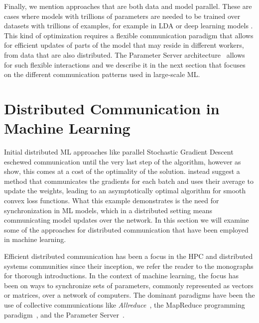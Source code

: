 Finally, we mention approaches that are both data and model parallel. These are
cases where models with trillions of parameters are needed to be trained over datasets with trillions of examples, for
example in LDA or deep learning models \cite{large-scale-dl, lightLDA}. This kind of
optimization requires a flexible communication paradigm that allows for efficient
updates of parts of the model that may reside in different workers, from data
that are also distributed. The Parameter Server architecture~\cite{muPS}
allows for such flexible interactions and we describe it in the next
section that focuses on the different communication patterns used
in large-scale ML.

\section{Distributed Communication in Machine Learning}
\label{sec:bg-ml-communication}

Initial distributed ML approaches like parallel Stochastic Gradient Descent
\cite{parallel-sgd} eschewed communication until the very last step of the
algorithm, however as \citet{dekel-optimal-distributed} show, this comes
at a cost of the optimality of the solution. \citeauthor{dekel-optimal-distributed}
instead suggest a method that communicates the gradients for each batch and uses
their average to update the weights, leading to an asymptotically optimal algorithm for smooth
convex loss functions. What this example demonstrates is the need for synchronization
in ML models, which in a distributed setting means communicating model updates
over the network. In this section we will examine some of the approaches for distributed
communication that have been employed in machine learning.

Efficient distributed communication has been a focus in the HPC and distributed systems
communities since their inception, we refer the reader to the monographs
\cite{hpc-intro, distributed-systems-book, distributed-systems-programming, distributed-systems-computation} for thorough introductions.
In the context of machine learning, the focus has been on ways to synchronize
sets of parameters, commonly represented as vectors or matrices, over a network
of computers. The dominant paradigms have been the use of collective communications
like \emph{Allreduce}~\cite{allreduce}, the MapReduce programming paradigm~\cite{mapreduce},
and the Parameter Server~\cite{muPS}.

